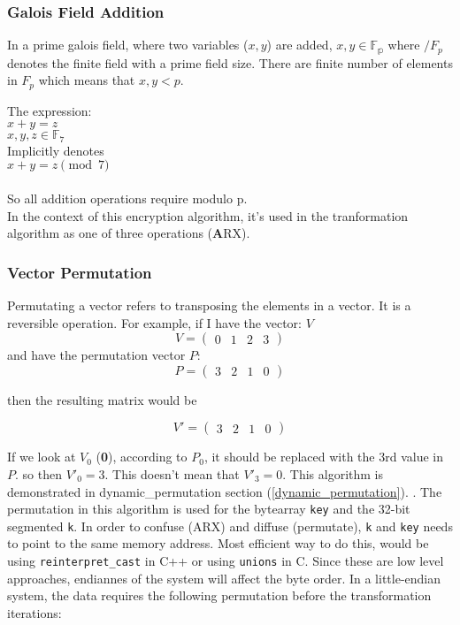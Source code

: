 \documentclass[fleqn, a4paper,12pt]{article}
\begin{document}
\subsubsection{Galois Field Addition}

In a prime galois field, where two variables ($x,y$) are added, $x,y \in \mathbb{F_p}$ where $\mathbb/{F_p}$ denotes the finite field with a prime field size. There are finite number of elements in $F_p$ which means that $x,y < p$. 

The expression:\\
$x + y = z$\\
$x,y,z \in \mathbb{F}_7$\\

Implicitly denotes \\
$x + y = z \pmod 7$\\
\\
So all addition operations require modulo p.\\
In the context of this encryption algorithm, it's used in the tranformation algorithm as one of three operations (\textbf{A}RX). 

\subsubsection{Vector Permutation}

Permutating a vector refers to transposing the elements in a vector. It is a reversible operation.
For example, if I have the vector: $V$ \\
\[
V = 
\begin{pmatrix}
	0 & 1 & 2 & 3
\end{pmatrix}
\]
and have the permutation vector $P$: \\

\[
P = 
\begin{pmatrix}
	3 & 2 & 1 & 0
\end{pmatrix}
\]

then the resulting matrix would be 

\[
V' = 
\begin{pmatrix}
	3 & 2 & 1 & 0
\end{pmatrix}
\]

If we look at $V_0$ (\textbf{0}),  according to $P_0$, it should be replaced with the 3rd value in $P$. so then $V'_0 = 3$. This doesn't mean that $V'_3 = 0$. This algorithm is demonstrated in dynamic\_permutation section (\ref{dynamic_permutation}).
. The permutation in this algorithm is used for the bytearray \texttt{key} and the 32-bit segmented \texttt{k}. In order to confuse (ARX) and diffuse (permutate), \texttt{k} and \texttt{key} needs to point to the same memory address. Most efficient way to do this, would be using \texttt{reinterpret\_cast} in C++ or using \texttt{unions} in C. Since these are low level approaches, endiannes of the system will affect the byte order. In a little-endian system, the data requires the following permutation before the transformation iterations:
\end{document}
